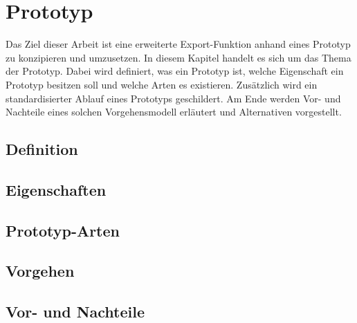 \chapter{Prototyp} \label{prototyp}
Das Ziel dieser Arbeit ist eine erweiterte Export-Funktion anhand eines Prototyp zu konzipieren und umzusetzen. In diesem Kapitel handelt es sich um das Thema der Prototyp. Dabei wird definiert, was ein Prototyp ist, welche Eigenschaft ein Prototyp besitzen soll und welche Arten es existieren. Zusätzlich wird ein standardisierter Ablauf eines Prototyps geschildert. Am Ende werden Vor- und Nachteile eines solchen Vorgehensmodell erläutert und Alternativen vorgestellt.

\section{Definition} \label{prot:Defintion}


\section{Eigenschaften} \label{prot:Eigenschaften}



\section{Prototyp-Arten} \label{prot:Prototyparten}


\section{Vorgehen} \label{prot:Prototyp_vorgehen}


\section{Vor- und Nachteile} \label{prot:Prototyp_vorteile}
